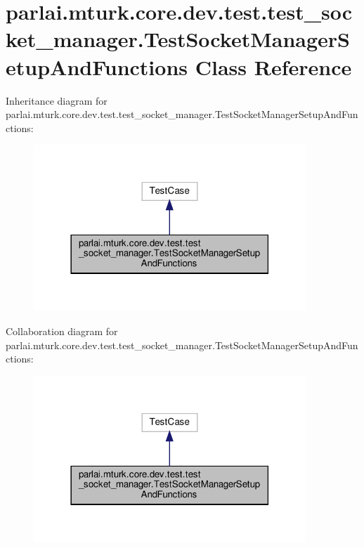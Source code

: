 \hypertarget{classparlai_1_1mturk_1_1core_1_1dev_1_1test_1_1test__socket__manager_1_1TestSocketManagerSetupAndFunctions}{}\section{parlai.\+mturk.\+core.\+dev.\+test.\+test\+\_\+socket\+\_\+manager.\+Test\+Socket\+Manager\+Setup\+And\+Functions Class Reference}
\label{classparlai_1_1mturk_1_1core_1_1dev_1_1test_1_1test__socket__manager_1_1TestSocketManagerSetupAndFunctions}


Inheritance diagram for parlai.\+mturk.\+core.\+dev.\+test.\+test\+\_\+socket\+\_\+manager.\+Test\+Socket\+Manager\+Setup\+And\+Functions\+:\nopagebreak
\begin{figure}[H]
\begin{center}
\leavevmode
\includegraphics[width=290pt]{d1/d51/classparlai_1_1mturk_1_1core_1_1dev_1_1test_1_1test__socket__manager_1_1TestSocketManagerSetupAndFunctions__inherit__graph}
\end{center}
\end{figure}


Collaboration diagram for parlai.\+mturk.\+core.\+dev.\+test.\+test\+\_\+socket\+\_\+manager.\+Test\+Socket\+Manager\+Setup\+And\+Functions\+:\nopagebreak
\begin{figure}[H]
\begin{center}
\leavevmode
\includegraphics[width=290pt]{de/d54/classparlai_1_1mturk_1_1core_1_1dev_1_1test_1_1test__socket__manager_1_1TestSocketManagerSetupAndFunctions__coll__graph}
\end{center}
\end{figure}
